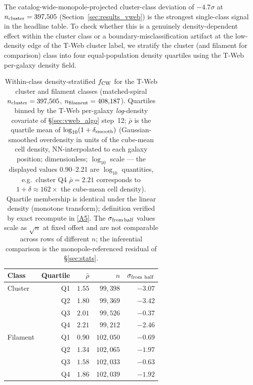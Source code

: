 \documentclass[aps,prd,twocolumn,superscriptaddress,showpacs,preprintnumbers,nofootinbib,longbibliography,floatfix]{revtex4-2}
\newcommand{\repoBase}{https://github.com/Hubify-Projects/bigbounce/blob/main}
\begin{document}
The catalog-wide-monopole-projected cluster-class deviation of $-4.7\sigma$ at
$n_{\rm cluster} = 397{,}505$ (Section~\ref{sec:results_vweb}) is the
strongest single-class signal in the headline table. To check whether
this is a genuinely density-dependent effect within the cluster class
or a boundary-misclassification artifact at the low-density edge of
the T-Web cluster label, we stratify the cluster (and filament for
comparison) class into four equal-population density quartiles using
the T-Web per-galaxy density field.

\begin{table}[ht]
\caption{Within-class density-stratified $f_{\rm CW}$ for the T-Web
cluster and filament classes (matched-spiral $n_{\rm cluster} =
397{,}505$, $n_{\rm filament} = 408{,}187$). Quartiles binned by the
T-Web per-galaxy \emph{log}-density covariate of \S\ref{sec:vweb_algo}
step~12; $\bar\rho$ is the quartile mean of
$\log_{10}(1 + \delta_{\rm smooth})$ (Gaussian-smoothed overdensity
in units of the cube-mean cell density, NN-interpolated to each
galaxy position; dimensionless; $\log_{10}$ scale --- the displayed
values 0.90--2.21 are $\log_{10}$ quantities, e.g.\ cluster
Q4 $\bar\rho=2.21$ corresponds to $1\!+\!\delta\approx\!162\times$
the cube-mean cell density). Quartile membership is identical under
the linear density (monotone transform); definition verified by exact
recompute in
\href{\repoBase/pipelines/p5\_desi\_chirality/outputs/21\_r23conf\_meta\_closures.json}{[A5]}.
The $\sigma_{\rm from\,half}$ values scale as $\sqrt{n}$ at fixed
offset and are not comparable across rows of different $n$; the
inferential comparison is the monopole-referenced residual of
\S\ref{sec:stats}.}
\label{tab:within_class_density}
\begin{ruledtabular}
\begin{tabular}{lrrrr}
Class & Quartile & $\bar\rho$ & $n$ & $\sigma_{\rm from\ half}$ \\
\hline
Cluster  & Q1 & $1.55$ & $99{,}398$ & $-3.07$ \\
         & Q2 & $1.80$ & $99{,}369$ & $-3.42$ \\
         & Q3 & $2.01$ & $99{,}526$ & $-0.37$ \\
         & Q4 & $2.21$ & $99{,}212$ & $-2.46$ \\
Filament & Q1 & $0.90$ & $102{,}050$ & $-0.69$ \\
         & Q2 & $1.34$ & $102{,}065$ & $-1.97$ \\
         & Q3 & $1.58$ & $102{,}033$ & $-0.63$ \\
         & Q4 & $1.86$ & $102{,}039$ & $-1.92$ \\
\end{tabular}
\end{ruledtabular}
\end{table}
\end{document}
